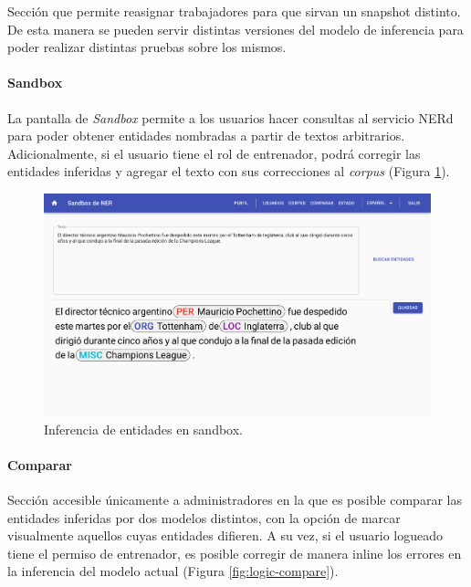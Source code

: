 \documentclass[12pt,a4paper,]{scrartcl}
\let\oldparagraph\paragraph
\renewcommand{\paragraph}[1]{\oldparagraph{#1}\mbox{}}
\begin{document}
Sección que permite reasignar trabajadores para que sirvan un snapshot distinto. De esta manera se pueden servir distintas versiones del modelo de inferencia para poder realizar distintas pruebas sobre los mismos.

\hypertarget{sandbox}{%
\paragraph{Sandbox}\label{sandbox}}

La pantalla de \emph{Sandbox} permite a los usuarios hacer consultas al servicio NERd para poder obtener entidades nombradas a partir de textos arbitrarios.
Adicionalmente, si el usuario tiene el rol de entrenador, podrá corregir las entidades inferidas y agregar el texto con sus correcciones al \emph{corpus} (Figura \ref{fig:logic-sandbox}).

\begin{figure}[H]

{\centering \includegraphics{assets/logic/sandbox.pdf} 

}

\caption{Inferencia de entidades en sandbox.}\label{fig:logic-sandbox}
\end{figure}

\hypertarget{comparar}{%
\paragraph{Comparar}\label{comparar}}

Sección accesible únicamente a administradores en la que es posible comparar las entidades inferidas por dos modelos distintos, con la opción de marcar visualmente aquellos cuyas entidades difieren. A su vez, si el usuario logueado tiene el permiso de entrenador, es posible corregir de manera inline los errores en la inferencia del modelo actual (Figura \ref{fig:logic-compare}).
\end{document}
